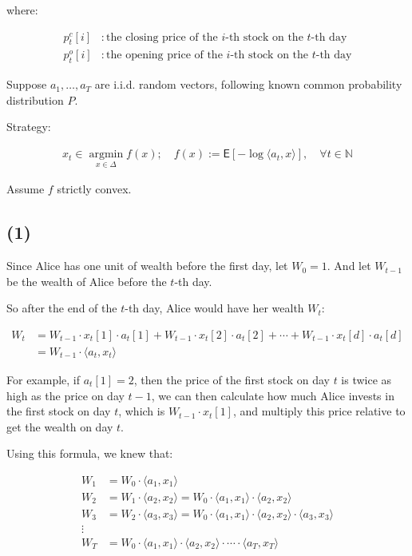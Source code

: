 \documentclass{article}
\begin{document}
where:

\begin{align*}
    p^c_t[i]&: \text{the closing price of the $i$-th stock on the $t$-th day} \\
    p^o_t[i]&: \text{the opening price of the $i$-th stock on the $t$-th day}
\end{align*}

Suppose $a_1, \ldots, a_T$ are i.i.d. random vectors, 
following known common probability distribution $P$.
\bigskip

Strategy:

\begin{align*}
    x_{t} \in \underset{x \in \Delta}{\operatorname{argmin}} f (x); \quad f (x) := \mathsf{E} \left[ - \log \langle a_t, x \rangle \right] , \quad \forall t \in \mathbb{N}
\end{align*}

Assume $f$ strictly convex.

\subsection*{(1)}

Since Alice has one unit of wealth before the first day, let $W_0 = 1$.
And let $W_{t-1}$ be the wealth of Alice before the $t$-th day.
\bigskip

So after the end of the $t$-th day, Alice would have her wealth $W_t$:

\begin{align*}
    W_t 
    &= W_{t-1} \cdot x_t[1] \cdot a_t[1] + W_{t-1} \cdot x_t[2] \cdot a_t[2] + \cdots + W_{t-1} \cdot x_t[d] \cdot a_t[d] \\
    &= W_{t-1} \cdot \langle a_t, x_t \rangle
\end{align*}

For example, if $a_t[1] = 2$, then the price of the first stock on day $t$ is twice as high as the price on day $t-1$, we can then calculate how much Alice invests in the first stock on day $t$, which is $W_{t-1} \cdot x_t[1]$, and multiply this price relative to get the wealth on day $t$.

Using this formula, we knew that:

\begin{align*}
    W_1 &= W_0 \cdot \langle a_1, x_1 \rangle \\
    W_2 &= W_1 \cdot \langle a_2, x_2 \rangle  = W_0 \cdot \langle a_1, x_1 \rangle \cdot \langle a_2, x_2 \rangle \\
    W_3 &= W_2 \cdot \langle a_3, x_3 \rangle  = W_0 \cdot \langle a_1, x_1 \rangle \cdot \langle a_2, x_2 \rangle \cdot \langle a_3, x_3 \rangle \\
    \vdots \\
    W_T &= W_0 \cdot \langle a_1, x_1 \rangle \cdot \langle a_2, x_2 \rangle \cdot \cdots \cdot \langle a_T, x_T \rangle
\end{align*}
\end{document}
